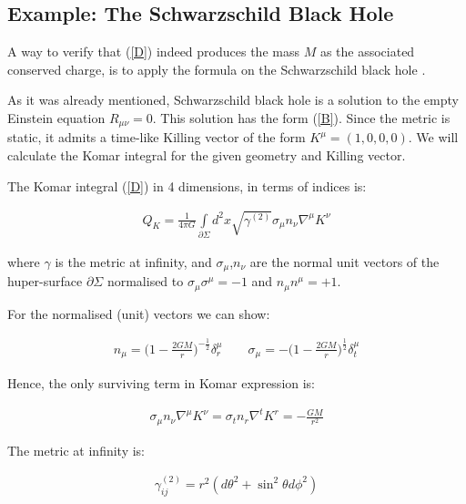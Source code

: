 \documentclass[a4paper,notitlepage]{report}
\begin{document}
\subsection{Example: The Schwarzschild Black Hole}

A way to verify that (\ref{D}) indeed produces the mass $M$ as the associated conserved charge, is to apply the formula on the Schwarzschild black hole \cite{carroll2004spacetime}.

As it was already mentioned, Schwarzschild black hole is a solution to the empty Einstein equation $R_{\mu\nu} = 0$. This solution has the form (\ref{B}). Since the metric is static, it admits a time-like Killing vector of the form $K^\mu = (1,0,0,0)$. We will calculate the Komar integral for the given geometry and Killing vector.

The Komar integral (\ref{D}) in 4 dimensions, in terms of indices is:

\begin{align}
Q_K = \frac{1}{4\pi G} \int\limits_{\partial\Sigma} d^2x \sqrt{\gamma^{(2)}} \sigma_\mu n_\nu \nabla^\mu K^\nu
\end{align}

\vspace{0.5 em}
where $\gamma$ is the metric at infinity, and $\sigma_\mu$,$n_\nu$ are the normal unit vectors of the huper-surface $\partial\Sigma$ normalised to $\sigma_\mu \sigma^\mu = -1$ and $n_\mu n^\mu = +1$.

For the normalised (unit) vectors we can show:

\begin{align}
n_\mu = \Big(1 - \frac{2GM}{r} \Big)^{-\frac{1}{2}} \delta^\mu_r \qquad \sigma_\mu = - \Big(1 - \frac{2GM}{r} \Big)^{\frac{1}{2}} \delta^\mu_t
\end{align}

\vspace{0.5 em}
Hence, the only surviving term in Komar expression is:

\begin{align} \label{3}
\sigma_\mu n_\nu \nabla^\mu K^\nu = \sigma_t n_r \nabla^t K^r = - \frac{GM}{r^2}
\end{align}

\vspace{0.5 em}
The metric at infinity is:

\begin{align}
\gamma^{(2)}_{ij} = r^2 (d\theta^2 + \sin^2\theta d\phi^2)
\end{align}
\end{document}
